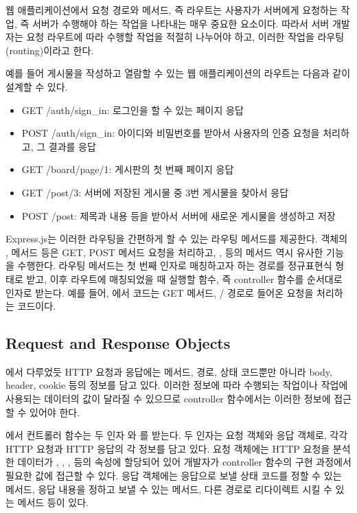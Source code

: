 웹 애플리케이션에서 요청 경로와 메서드, 즉 라우트는 사용자가 서버에게 요청하는 작업, 즉 서버가 수행해야 하는 작업을 나타내는 매우 중요한 요소이다. 따라서 서버 개발자는 요청 라우트에 따라 수행할 작업을 적절히 나누어야 하고, 이러한 작업을 라우팅(routing)이라고 한다.

예를 들어 게시물을 작성하고 열람할 수 있는 웹 애플리케이션의 라우트는 다음과 같이 설계할 수 있다.

\begin{itemize}
    \item GET /auth/sign\_in: 로그인을 할 수 있는 페이지 응답
    \item POST /auth/sign\_in: 아이디와 비밀번호를 받아서 사용자의 인증 요청을 처리하고, 그 결과를 응답
    \item GET /board/page/1: 게시판의 첫 번째 페이지 응답
    \item GET /post/3: 서버에 저장된 게시물 중 3번 게시물을 찾아서 응답
    \item POST /post: 제목과 내용 등을 받아서 서버에 새로운 게시물을 생성하고 저장
\end{itemize}

Express.js는 이러한 라우팅을 간편하게 할 수 있는 라우팅 메서드를 제공한다.  객체의 ,  메서드 등은 GET, POST 메서드 요청을 처리하고, ,  등의 메서드 역시 유사한 기능을 수행한다. 라우팅 메서드는 첫 번째 인자로 매칭하고자 하는 경로를 정규표현식 형태로 받고, 이후 라우트에 매칭되었을 때 실행할 함수, 즉 controller 함수를 순서대로 인자로 받는다. 예를 들어, 에서  코드는 GET 메서드, / 경로로 들어온 요청을 처리하는 코드이다.
\clearpage

\subsection*{Request and Response Objects}

에서 다루었듯 HTTP 요청과 응답에는 메서드, 경로, 상태 코드뿐만 아니라 body, header, cookie 등의 정보를 담고 있다. 이러한 정보에 따라 수행되는 작업이나 작업에 사용되는 데이터의 값이 달라질 수 있으므로 controller 함수에서는 이러한 정보에 접근할 수 있어야 한다.

에서 컨트롤러 함수는 두 인자 와 를 받는다. 두 인자는 요청 객체와 응답 객체로, 각각 HTTP 요청과  HTTP 응답의 각 정보를 담고 있다. 요청 객체에는 HTTP 요청을 분석한 데이터가 , , ,  등의 속성에 할당되어 있어 개발자가 controller 함수의 구현 과정에서 필요한 값에 접근할 수 있다. 응답 객체에는 응답으로 보낼 상태 코드를 정할 수 있는  메서드, 응답 내용을 정하고 보낼 수 있는  메서드, 다른 경로로 리다이렉트 시킬 수 있는  메서드 등이 있다.

